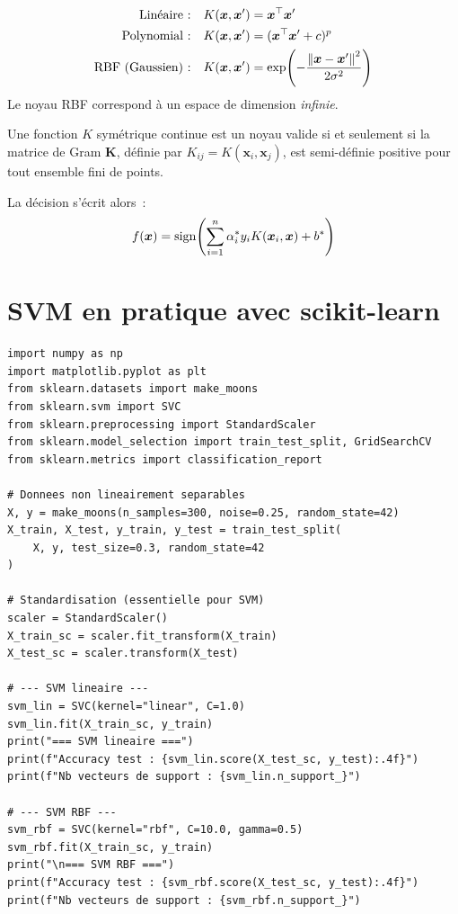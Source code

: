 \begin{formules}[title=\textbf{Noyaux classiques}]
\begin{align}
  \text{Lin\'eaire~:} \quad & K(\bm{x}, \bm{x}') = \bm{x}^\top\bm{x}'
  \label{eq:kernel-linear} \\
  \text{Polynomial~:} \quad & K(\bm{x}, \bm{x}') =
    (\bm{x}^\top\bm{x}' + c)^p
  \label{eq:kernel-poly} \\
  \text{RBF (Gaussien)~:} \quad & K(\bm{x}, \bm{x}') =
    \exp\!\left(-\frac{\left\| \bm{x} - \bm{x}' \right\|^2}{2\sigma^2}\right)
  \label{eq:kernel-rbf}
\end{align}
Le noyau RBF correspond \`a un espace de dimension \emph{infinie}.
\end{formules}

\begin{theoreme}[Mercer]
Une fonction $K$ sym\'etrique continue est un noyau valide si et seulement si
la matrice de Gram $\bm{K}$, d\'efinie par $K_{ij} = K(\bm{x}_i, \bm{x}_j)$,
est semi-d\'efinie positive pour tout ensemble fini de points.
\end{theoreme}

La d\'ecision s'\'ecrit alors~:
\begin{equation}
  f(\bm{x}) = \mathrm{sign}\!\left(\sum_{i=1}^n \alpha_i^* y_i
    K(\bm{x}_i, \bm{x}) + b^*\right)
  \label{eq:svm-decision-kernel}
\end{equation}

\section{SVM en pratique avec scikit-learn}
\label{sec:svm-sklearn}

\begin{codeblock}[title=\textbf{SVM lin\'eaire et RBF sur donn\'ees synth\'etiques}]
\begin{verbatim}
import numpy as np
import matplotlib.pyplot as plt
from sklearn.datasets import make_moons
from sklearn.svm import SVC
from sklearn.preprocessing import StandardScaler
from sklearn.model_selection import train_test_split, GridSearchCV
from sklearn.metrics import classification_report

# Donnees non lineairement separables
X, y = make_moons(n_samples=300, noise=0.25, random_state=42)
X_train, X_test, y_train, y_test = train_test_split(
    X, y, test_size=0.3, random_state=42
)

# Standardisation (essentielle pour SVM)
scaler = StandardScaler()
X_train_sc = scaler.fit_transform(X_train)
X_test_sc = scaler.transform(X_test)

# --- SVM lineaire ---
svm_lin = SVC(kernel="linear", C=1.0)
svm_lin.fit(X_train_sc, y_train)
print("=== SVM lineaire ===")
print(f"Accuracy test : {svm_lin.score(X_test_sc, y_test):.4f}")
print(f"Nb vecteurs de support : {svm_lin.n_support_}")

# --- SVM RBF ---
svm_rbf = SVC(kernel="rbf", C=10.0, gamma=0.5)
svm_rbf.fit(X_train_sc, y_train)
print("\n=== SVM RBF ===")
print(f"Accuracy test : {svm_rbf.score(X_test_sc, y_test):.4f}")
print(f"Nb vecteurs de support : {svm_rbf.n_support_}")
\end{verbatim}
\end{codeblock}

